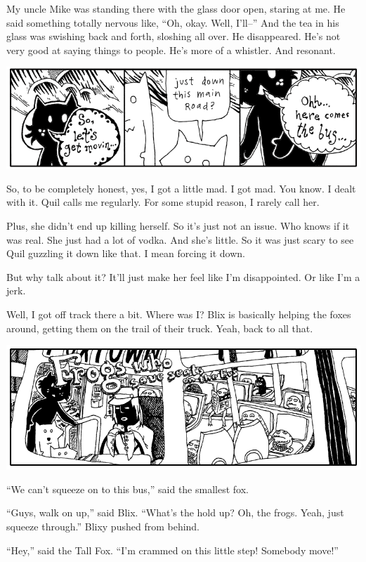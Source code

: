 \documentclass[10pt,twoside]{report}
\begin{document}
My uncle Mike was standing there with the glass door open, staring at
me.  He said something totally nervous like, ``Oh, okay.  Well,
I'll--'' And the tea in his glass was swishing back and forth,
sloshing all over.  He disappeared.  He's not very good at saying
things to people.  He's more of a whistler.  And resonant.

	\includegraphics[width=1.0\textwidth]{cache/70.png}

So, to be completely honest, yes, I got a little mad.  I got mad.  You
know.  I dealt with it. Quil calls me regularly.  For some stupid
reason, I rarely call her.

Plus, she didn't end up killing herself.  So it's just not an issue.
Who knows if it was real. She just had a lot of vodka.  And she's
little.  So it was just scary to see Quil guzzling it down like
that. I mean forcing it down.

But why talk about it?  It'll just make her feel like I'm
disappointed.  Or like I'm a jerk.

Well, I got off track there a bit.  Where was I?  Blix is basically
helping the foxes around, getting them on the trail of their truck.
Yeah, back to all that.

	\includegraphics[width=1.0\textwidth]{cache/71.png}

``We can't squeeze on to this bus,'' said the smallest fox.

``Guys, walk on up,'' said Blix.  ``What's the hold up?  Oh, the
        frogs.  Yeah, just squeeze through.'' Blixy pushed from
        behind.

``Hey,'' said the Tall Fox.  ``I'm crammed on this little step!
        Somebody move!''
\end{document}
